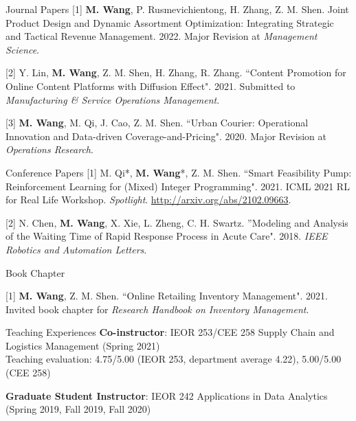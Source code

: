 \documentclass{resume} %
\makeatletter
\def\blfootnote{\xdef\@thefnmark{}\@footnotetext}
\makeatother
\begin{document}

\begin{rSection}{Journal Papers} 
[1] \textbf{M. Wang}, P. Rusmevichientong, H. Zhang, Z. M. Shen. Joint Product Design and Dynamic Assortment Optimization: Integrating Strategic and Tactical Revenue Management. 2022. Major Revision at \textit{Management Science}.

[2] Y. Lin, \textbf{M. Wang}, Z. M. Shen, H. Zhang, R. Zhang. ``Content Promotion for Online Content Platforms with Diffusion Effect". 2021. Submitted to \textit{Manufacturing \& Service Operations Management}.

[3] \textbf{M. Wang}, M. Qi, J. Cao, Z. M. Shen. ``Urban Courier: Operational Innovation and Data-driven Coverage-and-Pricing". 2020. Major Revision at \textit{Operations Research}.
\end{rSection}

\begin{rSection}{Conference Papers} 
[1] M. Qi*\blfootnote{* denotes alphabetical ordering.}, \textbf{M. Wang}*, Z. M. Shen. ``Smart Feasibility Pump: Reinforcement Learning for (Mixed) Integer Programming". 2021. ICML 2021 RL for Real Life Workshop. \textit{Spotlight}. \url{http://arxiv.org/abs/2102.09663}.

[2] N. Chen, \textbf{M. Wang}, X. Xie, L. Zheng, C. H. Swartz. ''Modeling and Analysis of the Waiting Time of Rapid Response Process in Acute Care". 2018. \textit{IEEE Robotics and Automation Letters}.
\end{rSection}

\newpage
\begin{rSection}{Book Chapter}

[1] \textbf{M. Wang}, Z. M. Shen. ``Online Retailing Inventory Management". 2021. Invited book chapter for \textit{Research Handbook on Inventory Management}. 

\end{rSection}

\begin{rSection}{Teaching Experiences}
\vspace{1mm}\textbf{Co-instructor}: IEOR 253/CEE 258 Supply Chain and Logistics Management (Spring 2021) \\Teaching evaluation: 4.75/5.00 (IEOR 253, department average 4.22), 5.00/5.00 (CEE 258)

\vspace{1mm}\textbf{Graduate Student Instructor}:
IEOR 242 Applications in Data Analytics (Spring 2019, Fall 2019, Fall 2020)





\end{rSection}
\end{document}
